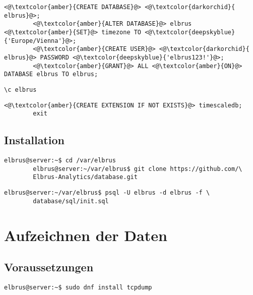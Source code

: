 \documentclass{article}
\begin{document}
	\lstset{style=files}
	\begin{lstlisting}[caption={Auführen von SQL Befehlen.}, numbers=none]
		<@\textcolor{amber}{CREATE DATABASE}@> <@\textcolor{darkorchid}{ elbrus}@>;
		<@\textcolor{amber}{ALTER DATABASE}@> elbrus <@\textcolor{amber}{SET}@> timezone TO <@\textcolor{deepskyblue}{'Europe/Vienna'}@>;
		<@\textcolor{amber}{CREATE USER}@> <@\textcolor{darkorchid}{ elbrus}@> PASSWORD <@\textcolor{deepskyblue}{'elbrus123!'}@>;
		<@\textcolor{amber}{GRANT}@> ALL <@\textcolor{amber}{ON}@> DATABASE elbrus TO elbrus;
	\end{lstlisting}
	
	\begin{lstlisting}[caption={Wechseln zu erstellter Datenbank.}, numbers=none]
		\c elbrus
	\end{lstlisting}

	\begin{lstlisting}[caption={Hinzufügen der TimescaleDB Erweiterung.}, numbers=none]
		<@\textcolor{amber}{CREATE EXTENSION IF NOT EXISTS}@> timescaledb;
		exit
	\end{lstlisting}

	\newpage
	\subsection{Installation}
	\lstset{style=commands}
	\begin{lstlisting}[caption={Clonen der Software von GitHub.}]
		elbrus@server:~$ cd /var/elbrus
		elbrus@server:~/var/elbrus$ git clone https://github.com/\
		Elbrus-Analytics/database.git
	\end{lstlisting}

	\begin{lstlisting}[caption={Anlegen der benötigten Tabellen duch das ausführen von 'init.sql'.}]
		elbrus@server:~/var/elbrus$ psql -U elbrus -d elbrus -f \
		database/sql/init.sql
	\end{lstlisting}
	
	\newpage
	
	\section{Aufzeichnen der Daten}
	\subsection{Voraussetzungen}
	\lstset{style=commands}
	\begin{lstlisting}[caption={Installieren von 'tcpdump' für das aufzeichnen von Daten.}]
		elbrus@server:~$ sudo dnf install tcpdump
	\end{lstlisting}
\end{document}
